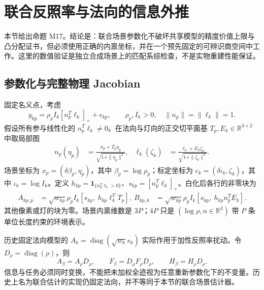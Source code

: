 \section{联合反照率与法向的信息外推}
\label{sec:joint-extension}

本节给出命题 M17。结论是：联合场景参数化不破坏共享模型的精度价值上限与凸分配证书，但必须使用正确的内禀坐标，并在一个预先固定的可辨识商空间中工作。这里的数值验证是独立合成场景上的匹配系综检查，不是实物重建性能保证。

\subsection{参数化与完整物理 Jacobian}

固定名义点，考虑
\begin{equation}
 y_{kp}=\rho_p I_k[n_p^T\ell_k]_++\epsilon_{kp},
 \qquad \rho_p,I_k>0,\quad \|n_p\|=\|\ell_k\|=1.
\end{equation}
假设所有参与线性化的 $n_p^T\ell_k\ne0$。在法向与灯向的正交切平面基 $T_p,E_k\in\mathbb R^{3\times2}$ 中取局部图
\begin{align}
 n_p(\eta_p)&=\frac{n_p+T_p\eta_p}{\sqrt{1+\|\eta_p\|^2}},&
 \ell_k(\zeta_k)&=\frac{\ell_k+E_k\zeta_k}{\sqrt{1+\|\zeta_k\|^2}}.
\end{align}
场景坐标为 $x_p=(\delta\beta_p,\eta_p)$，其中 $\beta_p=\log\rho_p$；标定坐标为 $c_k=(\delta\iota_k,\zeta_k)$，其中 $\iota_k=\log I_k$。定义 $h_{kp}=\boldsymbol1_{\{n_p^T\ell_k>0\}}$、$s_{kp}=[n_p^T\ell_k]_+$。白化后各行的非零块为
\begin{align}
 A_{kp,p}&=\sqrt{w_{kp}}\rho_pI_k
       [s_{kp},\ h_{kp}\ell_k^TT_p],\
 B_{kp,k}&=\sqrt{w_{kp}}\rho_pI_k
       [s_{kp},\ h_{kp}n_p^TE_k].
\end{align}
其他像素或灯的块为零。场景内禀维数是 $3P$；$4P$ 只是 $(\log\rho,n\in\mathbb R^3)$ 带 $P$ 条单位长度约束的环境表示。

历史固定法向模型的 $A_k=\operatorname{diag}(\sqrt{w_k}s_k)$ 实际作用于加性反照率扰动。令 $D_\rho=\operatorname{diag}(\rho)$，则
\begin{equation}
 A_\beta=A_\rho D_\rho,\qquad
 F_\beta=D_\rho F_\rho D_\rho,\qquad H_\beta=H_\rho D_\rho.
\end{equation}
信息与任务必须同时变换，不能把未加权全迹视为任意重新参数化下的不变量。历史上名为联合估计的实现仍固定法向，并不等同于本节的联合场景估计器。

